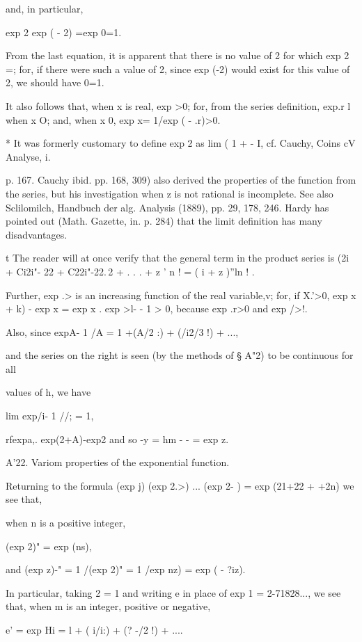 and, in particular,

 exp 2 exp ( - 2) =exp 0=1.

From the last equation, it is apparent that there is no value of 2 for
which exp 2 =; for, if there were such a value of 2, since exp (-2)
would exist for this value of 2, we should have 0=1.

It also follows that, when x is real, exp >0; for, from the series
definition, exp.r l when x O; and, when x 0, exp x= 1/exp ( - .r)>0.

* It was formerly customary to define exp 2 as lim ( 1 + - I, cf.
  Cauchy, Coins cV Analyse, i.

p. 167. Cauchy ibid. pp. 168, 309) also derived the properties of the
function from the series, but his investigation when z is not rational
is incomplete. See also Sclilomilch, Handbuch der alg. Analysis
(1889), pp. 29, 178, 246. Hardy has pointed out (Math. Gazette, in. p.
284) that the limit definition has many disadvantages.

t The reader will at once verify that the general term in the product
series is (2i + Ci2i"- 22 + C22i"-22.\,2 + . . . + z ' n ! = ( i + z
)''ln ! .

%
%

Further, exp .> is an increasing function of the real variable,v;
for, if X.'>0, exp x + k) - exp x = exp x . exp >l- - 1 > 0, because
exp .r>0 and exp />!.

Also, since expA- 1 /A = 1 +(A/2 :) + (/i2/3 !) + ...,

and the series on the right is seen (by the methods of § A"2) to be
continuous for all

values of h, we have

lim exp/i- 1 //; = 1,

rfexpa,. exp(2+A)-exp2 and so -y = hm - - = exp z.

A'22. Variom properties of the exponential function.

Returning to the formula (exp j) (exp 2.>) ... (exp 2- ) = exp (21+22
+ +2n) we see that,

when n is a positive integer,

(exp 2)" = exp (ns),

and (exp z)-" = 1 /(exp 2)" = 1 /exp nz) = exp ( - ?iz).

In particular, taking 2 = 1 and writing e in place of exp 1 =
2-71828..., we see that, when m is an integer, positive or negative,

e' = exp Hi = l + ( i/i:) + (? -/2 !) + ....


